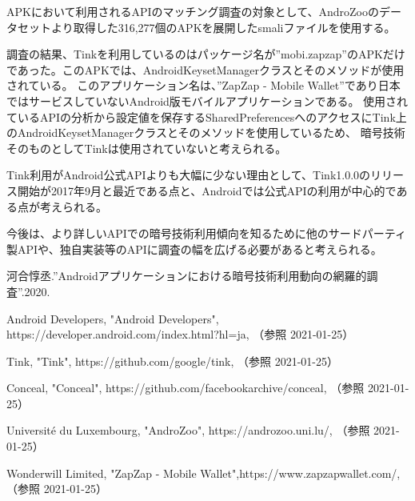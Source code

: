 \documentclass[twocolumn, 10pt, a4paper]{jarticle}
\begin{document}
APKにおいて利用されるAPIのマッチング調査の対象として、AndroZoo\cite{AndroZoo}のデータセットより取得した316,277個のAPKを展開したsmaliファイルを使用する。

調査の結果、Tinkを利用しているのはパッケージ名が''mobi.zapzap''のAPKだけであった。このAPKでは、AndroidKeysetManagerクラスとそのメソッドが使用されている。
このアプリケーション名は、''ZapZap - Mobile Wallet''\cite{ZapZap}であり日本ではサービスしていないAndroid版モバイルアプリケーションである。
使用されているAPIの分析から設定値を保存するSharedPreferencesへのアクセスにTink上のAndroidKeysetManagerクラスとそのメソッドを使用しているため、
暗号技術そのものとしてTinkは使用されていないと考えられる。

Tink利用がAndroid公式APIよりも大幅に少ない理由として、Tink1.0.0のリリース開始が2017年9月と最近である点と、Androidでは公式APIの利用が中心的である点が考えられる。

今後は、より詳しいAPIでの暗号技術利用傾向を知るために他のサードパーティ製APIや、独自実装等のAPIに調査の幅を広げる必要があると考えられる。



\begin{thebibliography}{10}

河合惇丞.''Androidアプリケーションにおける暗号技術利用動向の網羅的調査''.2020.

Android Developers, "Android Developers", https://developer.android.com/index.html?hl=ja, （参照 2021-01-25）

Tink, "Tink", https://github.com/google/tink, （参照 2021-01-25）

Conceal, "Conceal", https://github.com/facebookarchive/conceal, （参照 2021-01-25）

Université du Luxembourg, "AndroZoo",  https://androzoo.uni.lu/, （参照 2021-01-25）

Wonderwill Limited, "ZapZap - Mobile Wallet",https://www.zapzapwallet.com/,（参照 2021-01-25）
\end{thebibliography}
\end{document}
